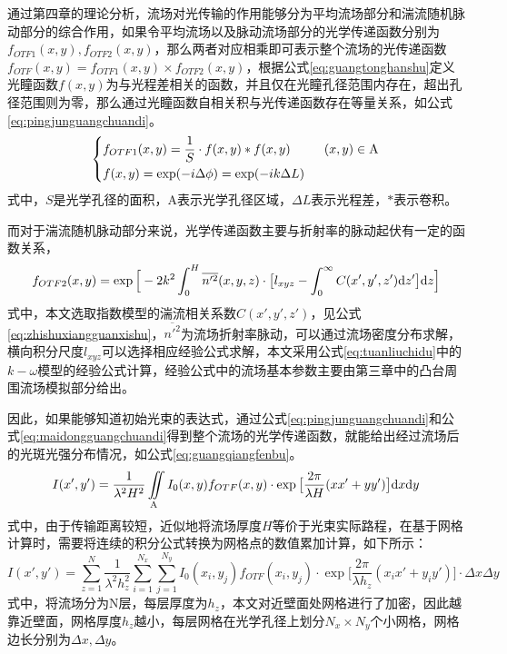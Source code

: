 通过第四章的理论分析，流场对光传输的作用能够分为平均流场部分和湍流随机脉动部分的综合作用，如果令平均流场以及脉动流场部分的光学传递函数分别为$f_{OTF1}(x,y),f_{OTF2}(x,y)$，那么两者对应相乘即可表示整个流场的光传递函数$f_{OTF}(x,y)=f_{OTF1}(x,y)\times f_{OTF2}(x,y)$，根据公式\eqref{eq:guangtonghanshu}定义光瞳函数$f(x,y)$为与光程差相关的函数，并且仅在光瞳孔径范围内存在，超出孔径范围则为零，那么通过光瞳函数自相关积与光传递函数存在等量关系，如公式\eqref{eq:pingjunguangchuandi}。
\begin{equation}
\left\{\begin{aligned}
&f_{OTF1}(x,y)=\frac{1}{S}\cdot f(x,y)*f(x,y)~~~~~~~~(x,y)\in {\rm A}\\
&f(x,y)=\exp(-i\Delta\phi)=\exp(-ik\Delta L)
\end{aligned}
\right.\label{eq:pingjunguangchuandi}
\end{equation}
式中，$S$是光学孔径的面积，A表示光学孔径区域，$\Delta L$表示光程差，$*$表示卷积。

而对于湍流随机脉动部分来说，光学传递函数主要与折射率的脉动起伏有一定的函数关系，
\begin{equation}
f_{OTF2}(x,y)=\exp\Big[-2k^2\int_0^H\overline{n'^2}(x,y,z)\cdot\big[l_{xyz}-\int_0^\infty C(x',y',z'){\rm d}z'\big]{\rm d}z\Big]
\label{eq:maidongguangchuandi}
\end{equation}
式中，本文选取指数模型的湍流相关系数$C(x',y',z')$，见公式\eqref{eq:zhishuxiangguanxishu}，$\overline{n'^2}$为流场折射率脉动，可以通过流场密度分布求解，横向积分尺度$l_{xyz}$可以选择相应经验公式求解，本文采用公式\eqref{eq:tuanliuchidu}中的$k-\omega$模型的经验公式计算，经验公式中的流场基本参数主要由第三章中的凸台周围流场模拟部分给出。

因此，如果能够知道初始光束的表达式，通过公式\eqref{eq:pingjunguangchuandi}和公式\eqref{eq:maidongguangchuandi}得到整个流场的光学传递函数，就能给出经过流场后的光斑光强分布情况，如公式\eqref{eq:guangqiangfenbu}。
\begin{equation}
I(x',y')=\frac{1}{\lambda^2H^2}\iint\limits_{\rm A}I_0(x,y)f_{OTF}(x,y)\cdot\exp\big[\frac{2\pi}{\lambda H}(xx'+yy')\big]{\rm d}x{\rm d}y
\label{eq:gaungqiangfenbu}
\end{equation}
式中，由于传输距离较短，近似地将流场厚度$H$等价于光束实际路程，在基于网格计算时，需要将连续的积分公式转换为网格点的数值累加计算，如下所示：
\begin{equation}
I(x',y')=\sum\limits_{z=1}^{N}\frac{1}{\lambda^2h_z^2}\sum\limits_{i=1}^{N_x}\sum\limits_{j=1}^{N_y}I_0(x_i,y_j)f_{OTF}(x_i,y_j)\cdot\exp\big[\frac{2\pi}{\lambda h_z}(x_ix'+y_iy')\big]\cdot\Delta x\Delta y
\label{eq:gaungqiangfenbu1}
\end{equation}
式中，将流场分为N层，每层厚度为$h_z$，本文对近壁面处网格进行了加密，因此越靠近壁面，网格厚度$h_z$越小，每层网格在光学孔径上划分$N_x\times N_y$个小网格，网格边长分别为$\Delta x,\Delta y$。

